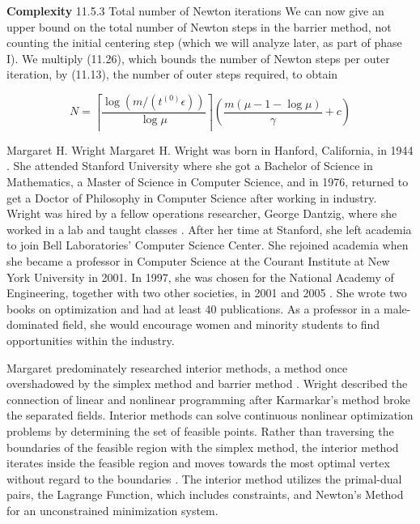 \textbf{Complexity}
11.5.3 Total number of Newton iterations
We can now give an upper bound on the total number of Newton steps in the barrier method, not counting the initial centering step (which we will analyze later, as part of phase I). We multiply (11.26), which bounds the number of Newton steps per outer iteration, by (11.13), the number of outer steps required, to obtain

$$
N=\left\lceil\frac{\log \left(m /\left(t^{(0)} \epsilon\right)\right)}{\log \mu}\right\rceil\left(\frac{m(\mu-1-\log \mu)}{\gamma}+c\right)
$$


\begin{refsection}
\begin{pioneerspotlight}{Margaret H. Wright}
Margaret H. Wright was born in Hanford, California, in 1944 \parencite{riddle_2025_margaret}. She attended Stanford University where she got a Bachelor of Science in Mathematics, a Master of Science in Computer Science, and in 1976, returned to get a Doctor of Philosophy in Computer Science after working in industry. Wright was hired by a fellow operations researcher, George Dantzig, where she worked in a lab and taught classes \parencite{informs_2025_wright}. After her time at Stanford, she left academia to join Bell Laboratories’ Computer Science Center. She rejoined academia when she became a professor in Computer Science at the Courant Institute at New York University in 2001. In 1997, she was chosen for the National Academy of Engineering, together with two other societies, in 2001 and 2005 \parencite{riddle_2025_margaret}. She wrote two books on optimization and had at least 40 publications. As a professor in a male-dominated field, she would encourage women and minority students to find opportunities within the industry.

Margaret predominately researched interior methods, a method once overshadowed by the simplex method and barrier method \parencite{wright_2004_the}. Wright described the connection of linear and nonlinear programming after Karmarkar’s method broke the separated fields. Interior methods can solve continuous nonlinear optimization problems by determining the set of feasible points. Rather than traversing the boundaries of the feasible region with the simplex method, the interior method iterates inside the feasible region and moves towards the most optimal vertex without regard to the boundaries \parencite{lauterio_2022_interiorpoint}. The interior method utilizes the primal-dual pairs, the Lagrange Function, which includes constraints, and Newton’s Method for an unconstrained minimization system.


\end{pioneerspotlight}
\end{refsection}
